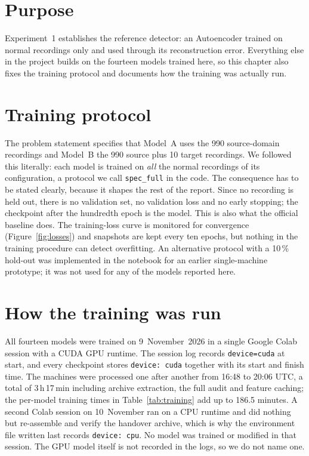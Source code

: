 \section{Purpose}
Experiment~1 establishes the reference detector: an Autoencoder trained on normal recordings only and used through its reconstruction error. Everything else in the project builds on the fourteen models trained here, so this chapter also fixes the training protocol and documents how the training was actually run.

\section{Training protocol}\label{sec:protocol}
The problem statement specifies that Model~A uses the 990 source-domain recordings and Model~B the 990 source plus 10 target recordings. We followed this literally: each model is trained on \emph{all} the normal recordings of its configuration, a protocol we call \texttt{spec\_full} in the code. The consequence has to be stated clearly, because it shapes the rest of the report. Since no recording is held out, there is no validation set, no validation loss and no early stopping; the checkpoint after the hundredth epoch is the model. This is also what the official baseline does. The training-loss curve is monitored for convergence (Figure~\ref{fig:losses}) and snapshots are kept every ten epochs, but nothing in the training procedure can detect overfitting. An alternative protocol with a 10\,\% hold-out was implemented in the notebook for an earlier single-machine prototype; it was not used for any of the models reported here.

\section{How the training was run}
All fourteen models were trained on 9~November~2026 in a single Google Colab session with a CUDA GPU runtime. The session log records \texttt{device=cuda} at start, and every checkpoint stores \texttt{device: cuda} together with its start and finish time. The machines were processed one after another from 16:48 to 20:06 UTC, a total of 3\,h\,17\,min including archive extraction, the full audit and feature caching; the per-model training times in Table~\ref{tab:training} add up to 186.5 minutes. A second Colab session on 10~November ran on a CPU runtime and did nothing but re-assemble and verify the handover archive, which is why the environment file written last records \texttt{device: cpu}. No model was trained or modified in that session. The GPU model itself is not recorded in the logs, so we do not name one.

